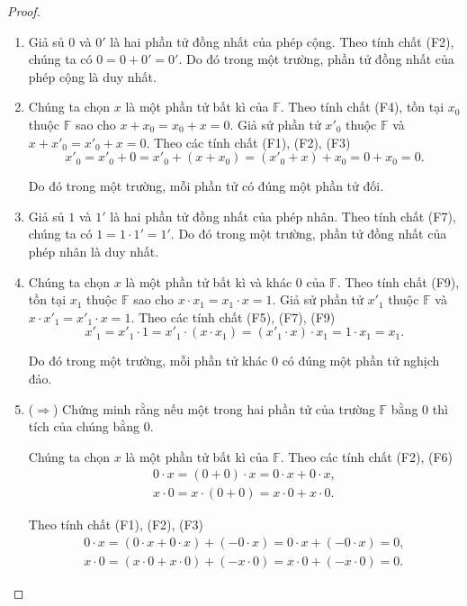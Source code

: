 \begin{proof}
    \begin{enumerate}[label={(\roman*)},itemsep=0pt]
        \item Giả sủ $0$ và $0'$ là hai phần tử đồng nhất của phép cộng. Theo tính chất (F2), chúng ta có $0 = 0 + 0' = 0'$. Do đó trong một trường, phần tử đồng nhất của phép cộng là duy nhất.
        \item Chúng ta chọn $x$ là một phần tử bất kì của $\mathbb{F}$. Theo tính chất (F4), tồn tại $x_{0}$ thuộc $\mathbb{F}$ sao cho $x + x_{0} = x_{0} + x = 0$. Giả sử phần tử $x'_{0}$ thuộc $\mathbb{F}$ và $x + x'_{0} = x'_{0} + x = 0$. Theo các tính chất (F1), (F2), (F3)
              \[
                  x'_{0} = x'_{0} + 0 = x'_{0} + (x + x_{0}) = (x'_{0} + x) + x_{0} = 0 + x_{0} = 0.
              \]

              Do đó trong một trường, mỗi phần tử có đúng một phần tử đối.
        \item Giả sủ $1$ và $1'$ là hai phần tử đồng nhất của phép nhân. Theo tính chất (F7), chúng ta có $1 = 1\cdot 1' = 1'$. Do đó trong một trường, phần tử đồng nhất của phép nhân là duy nhất.
        \item Chúng ta chọn $x$ là một phần tử bất kì và khác $0$ của $\mathbb{F}$. Theo tính chất (F9), tồn tại $x_{1}$ thuộc $\mathbb{F}$ sao cho $x\cdot x_{1} = x_{1}\cdot x = 1$. Giả sử phần tử $x'_{1}$ thuộc $\mathbb{F}$ và $x\cdot x'_{1} = x'_{1}\cdot x = 1$. Theo các tính chất (F5), (F7), (F9)
              \[
                  x'_{1} = x'_{1}\cdot 1 = x'_{1}\cdot (x\cdot x_{1}) = (x'_{1}\cdot x)\cdot x_{1} = 1\cdot x_{1} = x_{1}.
              \]

              Do đó trong một trường, mỗi phần tử khác $0$ có đúng một phần tử nghịch đảo.
        \item ($\Rightarrow$) Chứng minh rằng nếu một trong hai phần tử của trường $\mathbb{F}$ bằng $0$ thì tích của chúng bằng $0$.

              Chúng ta chọn $x$ là một phần tử bất kì của $\mathbb{F}$. Theo các tính chất (F2), (F6)
              \[
                  \begin{split}
                      0\cdot x = (0 + 0)\cdot x = 0\cdot x + 0\cdot x, \\
                      x\cdot 0 = x\cdot (0 + 0) = x\cdot 0 + x\cdot 0.
                  \end{split}
              \]

              Theo tính chất (F1), (F2), (F3)
              \[
                  \begin{split}
                      0\cdot x = (0\cdot x + 0\cdot x) + (-0\cdot x) = 0\cdot x + (-0\cdot x) = 0, \\
                      x\cdot 0 = (x\cdot 0 + x\cdot 0) + (-x\cdot 0) = x\cdot 0 + (-x\cdot 0) = 0.
                  \end{split}
              \]


\end{enumerate}
\end{proof}
